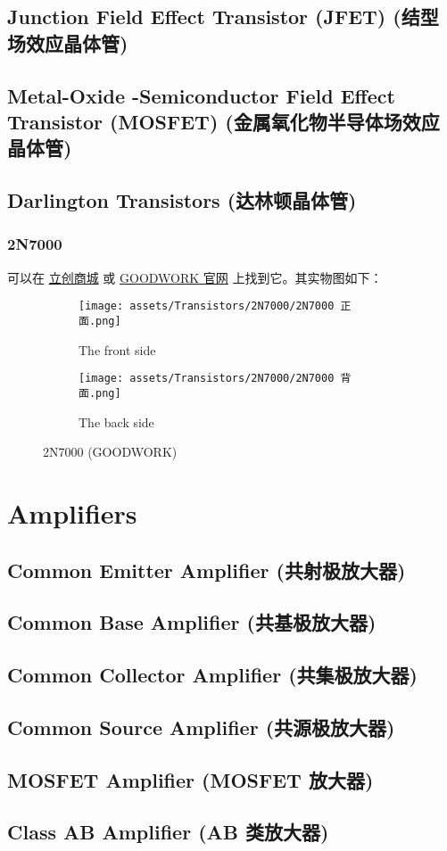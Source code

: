 \documentclass[UTF8]{report}
\begin{document}
\section{Junction Field Effect Transistor (JFET) (结型场效应晶体管)}
\section{Metal-Oxide -Semiconductor Field Effect Transistor (MOSFET) (金属氧化物半导体场效应晶体管)}
\section{Darlington Transistors (达林顿晶体管)}

\subsection{2N7000}

可以在 \href{https://item.szlcsc.com/232636.html}{立创商城} 或  \href{https://www.GOODWORK.com/products/discrete-power-modules/mosfets/small-signal-mosfets/1N4007}{GOODWORK 官网} 上找到它。其实物图如下：

\begin{figure}[H]\centering
    \begin{subfigure}[b]{0.5\columnwidth}\centering
        \texttt{[image: assets/Transistors/2N7000/2N7000 正面.png]}
        \caption{The front side}
    \end{subfigure}\hfill
    \begin{subfigure}[b]{0.5\columnwidth}\centering
        \texttt{[image: assets/Transistors/2N7000/2N7000 背面.png]}
        \caption{The back side}
    \end{subfigure}
    \caption{2N7000 (GOODWORK)}
    \end{figure}

\chapter{Amplifiers}\thispagestyle{fancy}
\section{Common Emitter Amplifier (共射极放大器)}
\section{Common Base Amplifier (共基极放大器)}
\section{Common Collector Amplifier (共集极放大器)}
\section{Common Source Amplifier (共源极放大器)}
\section{MOSFET Amplifier (MOSFET 放大器)}
\section{Class AB Amplifier (AB 类放大器)}

\chapter{}\thispagestyle{fancy}
\end{document}
